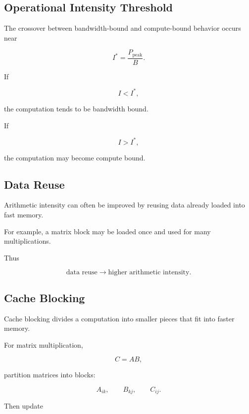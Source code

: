 \subsection{Operational Intensity Threshold}
\label{subsec:roofline-threshold}

The crossover between bandwidth-bound and compute-bound behavior occurs
near

\[
\boxed{
I^*
=
\frac{
P_{\mathrm{peak}}
}{
B
}.
}
\]

If

\[
I<I^*,
\]

the computation tends to be bandwidth bound.

If

\[
I>I^*,
\]

the computation may become compute bound.

\subsection{Data Reuse}
\label{subsec:hpmc-data-reuse}

Arithmetic intensity can often be improved by reusing data already loaded
into fast memory.

For example, a matrix block may be loaded once and used for many
multiplications.

Thus

\[
\boxed{
\text{data reuse}
\longrightarrow
\text{higher arithmetic intensity}.
}
\]

\subsection{Cache Blocking}
\label{subsec:cache-blocking}

Cache blocking divides a computation into smaller pieces that fit into
faster memory.

For matrix multiplication,

\[
C=AB,
\]

partition matrices into blocks:

\[
\boxed{
A_{ik},
\qquad
B_{kj},
\qquad
C_{ij}.
}
\]

Then update

